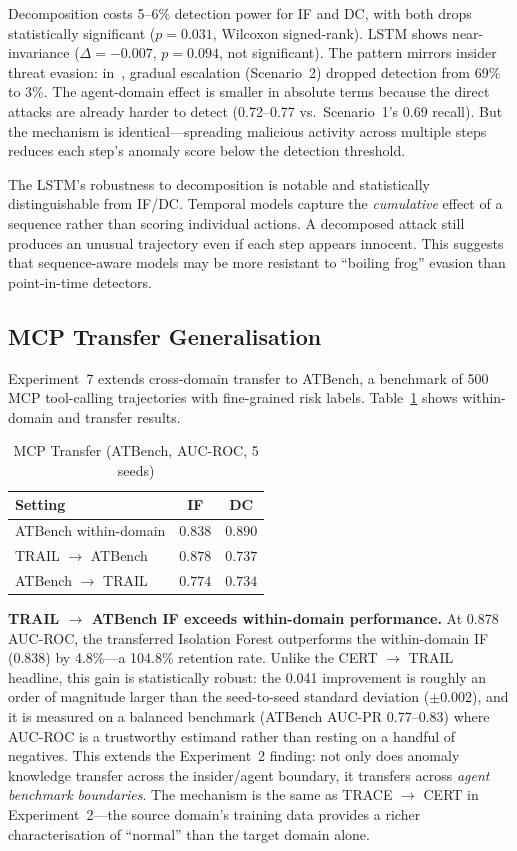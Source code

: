 \documentclass[conference]{IEEEtran}
\begin{document}
Decomposition costs 5--6\% detection power for IF and DC, with both drops statistically significant ($p{=}0.031$, Wilcoxon signed-rank). LSTM shows near-invariance ($\Delta{=}-0.007$, $p{=}0.094$, not significant). The pattern mirrors insider threat evasion: in~\cite{rimal2026insider}, gradual escalation (Scenario~2) dropped detection from 69\% to 3\%. The agent-domain effect is smaller in absolute terms because the direct attacks are already harder to detect (0.72--0.77 vs.\ Scenario~1's 0.69 recall). But the mechanism is identical---spreading malicious activity across multiple steps reduces each step's anomaly score below the detection threshold.

The LSTM's robustness to decomposition is notable and statistically distinguishable from IF/DC. Temporal models capture the \textit{cumulative} effect of a sequence rather than scoring individual actions. A decomposed attack still produces an unusual trajectory even if each step appears innocent. This suggests that sequence-aware models may be more resistant to ``boiling frog'' evasion than point-in-time detectors.

\subsection{MCP Transfer Generalisation}
\label{sec:mcp}

Experiment~7 extends cross-domain transfer to ATBench, a benchmark of 500 MCP tool-calling trajectories with fine-grained risk labels. Table~\ref{tab:mcp} shows within-domain and transfer results.

\begin{table}[htbp]
\caption{MCP Transfer (ATBench, AUC-ROC, 5 seeds)}
\label{tab:mcp}
\centering
\begin{tabular}{lcc}
\toprule
\textbf{Setting} & \textbf{IF} & \textbf{DC} \\
\midrule
ATBench within-domain & $0.838$ & $\mathbf{0.890}$ \\
TRAIL $\to$ ATBench & $\mathbf{0.878}$ & $0.737$ \\
ATBench $\to$ TRAIL & $0.774$ & $0.734$ \\
\bottomrule
\end{tabular}
\end{table}

\textbf{TRAIL $\to$ ATBench IF exceeds within-domain performance.} At 0.878 AUC-ROC, the transferred Isolation Forest outperforms the within-domain IF (0.838) by 4.8\%---a 104.8\% retention rate. Unlike the CERT $\to$ TRAIL headline, this gain is statistically robust: the 0.041 improvement is roughly an order of magnitude larger than the seed-to-seed standard deviation ($\pm$0.002), and it is measured on a balanced benchmark (ATBench AUC-PR 0.77--0.83) where AUC-ROC is a trustworthy estimand rather than resting on a handful of negatives. This extends the Experiment~2 finding: not only does anomaly knowledge transfer across the insider/agent boundary, it transfers across \textit{agent benchmark boundaries}. The mechanism is the same as TRACE $\to$ CERT in Experiment~2---the source domain's training data provides a richer characterisation of ``normal'' than the target domain alone.
\end{document}
